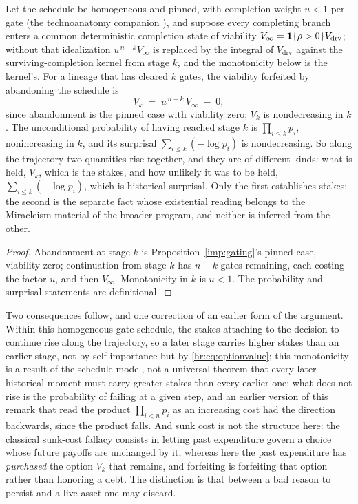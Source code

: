 \begin{proposition}\label{hr:rem:monotone}
Let the schedule be homogeneous and pinned, with completion weight
$u<1$ per gate (the technoanatomy companion \cite{GoldenTechnoanatomy}), and suppose
every completing branch enters a common deterministic completion state
of viability $V_\infty=\mathbf{1}\{\rho>0\}V_{\mathrm{drv}}$; without that
idealization $u^{\,n-k}V_\infty$ is replaced by the integral of
$V_{\mathrm{drv}}$ against the surviving-completion kernel from stage
$k$, and the monotonicity below is the kernel's. For a lineage that has
cleared $k$ gates, the viability forfeited by abandoning the schedule
is
\begin{equation}\label{hr:eq:optionvalue}
V_k\;=\;u^{\,n-k}\,V_\infty\;-\;0,
\end{equation}
since abandonment is the pinned case with viability zero; $V_k$ is
nondecreasing in $k$. The unconditional probability of having reached
stage $k$ is $\prod_{i\le k}p_i$, nonincreasing in $k$, and its
surprisal $\sum_{i\le k}(-\log p_i)$ is nondecreasing. So along the
trajectory two quantities rise together, and they are of different
kinds: what is held, $V_k$, which is the stakes, and how unlikely it
was to be held, $\sum_{i\le k}(-\log p_i)$, which is historical
surprisal. Only the first establishes stakes; the second is the
separate fact whose existential reading belongs to the Miracleism
material of the broader program, and neither is inferred from the
other.
\end{proposition}

\begin{proof}
Abandonment at stage $k$ is Proposition~\ref{imp:gating}'s pinned
case, viability zero; continuation from stage $k$ has $n-k$ gates
remaining, each costing the factor $u$, and then $V_\infty$. Monotonicity
in $k$ is $u<1$. The probability and surprisal statements are
definitional.
\end{proof}

\noindent Two consequences follow, and one correction of an earlier
form of the argument. Within this homogeneous gate schedule, the stakes attaching to the
decision to continue rise along the trajectory, so a later stage carries
higher stakes than an earlier stage, not by self-importance but by
\eqref{hr:eq:optionvalue}; this monotonicity is a result of the schedule
model, not a universal theorem that every later historical moment must
carry greater stakes than every earlier one;
what does not rise is the probability of failing at a given step, and an
earlier version of this remark that read the product $\prod_{i<n}p_i$
as an increasing cost had the direction backwards, since the product
falls. And sunk cost is not the structure here: the classical sunk-cost
fallacy consists in letting past expenditure govern a choice whose
future payoffs are unchanged by it, whereas here the past expenditure
has \emph{purchased} the option $V_k$ that remains, and forfeiting is
forfeiting that option rather than honoring a debt. The distinction is
that between a bad reason to persist and a live asset one may discard.

